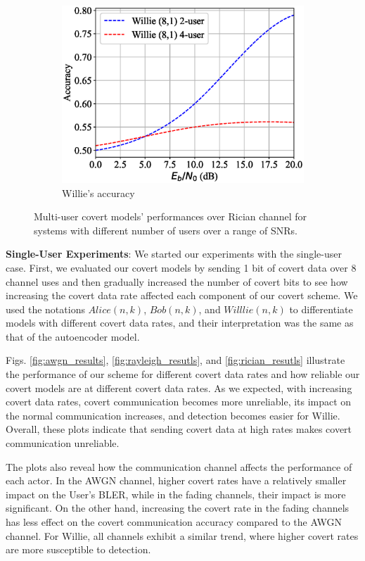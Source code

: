 \begin{figure}[tp!]
\begin{subfigure}{0.28\textwidth}
		\includegraphics[width=\linewidth]{figs/multi_willie_accuracy_rician}
		\caption{Willie's accuracy}
		\label{fig:multi_rician_results_willie}
	\end{subfigure}
	\caption{Multi-user covert models' performances over Rician channel for systems with different number of users over a range of SNRs.}
	\label{fig:multi_rician_results}
\end{figure}

\textbf{Single-User Experiments}: 
We started our experiments with the single-user case. First, we evaluated our covert models by sending 1 bit of covert data over 8 channel uses and then gradually increased the number of covert bits to see how increasing the covert data rate affected each component of our covert scheme. We used the notations \(Alice (n,k)\), \(Bob (n,k)\), and \(Willlie (n,k)\) to differentiate models with different covert data rates, and their interpretation was the same as that of the autoencoder model.

Figs. \ref{fig:awgn_results}, \ref{fig:rayleigh_resutls}, and \ref{fig:rician_resutls} illustrate the performance of our scheme for different covert data rates and how reliable our covert models are at different covert data rates. As we expected, with increasing covert data rates, covert communication becomes more unreliable, its impact on the normal communication increases, and detection becomes easier for Willie. Overall, these plots indicate that sending covert data at high rates makes covert communication unreliable.

The plots also reveal how the communication channel affects the performance of each actor. In the AWGN channel, higher covert rates have a relatively smaller impact on the User's BLER, while in the fading channels, their impact is more significant. On the other hand, increasing the covert rate in the fading channels has less effect on the covert communication accuracy compared to the AWGN channel. For Willie, all channels exhibit a similar trend, where higher covert rates are more susceptible to detection.

